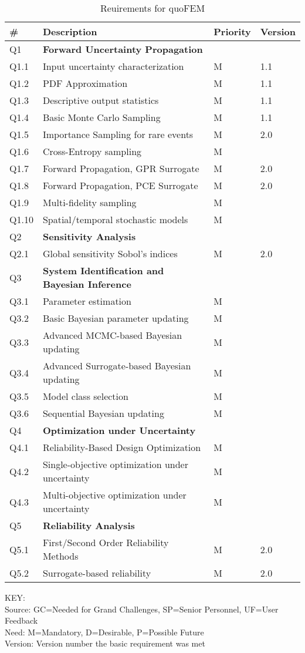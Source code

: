 \begin{longtable}{| p{} | p{} | p{} | p{} |}

\caption{Reuirements for quoFEM}             
  \label{tab:featureQuo_FEM}     
     \\
   \hline
\rowcolor{lightgray}

      \# & Description & Priority & Version \\ \hline
     Q1 & \textbf{Forward Uncertainty Propagation} &  &  \\ 
	Q1.1 & Input uncertainty characterization & M & 1.1 \\ \hline
	Q1.2 & PDF Approximation & M & 1.1 \\ \hline
	Q1.3 &  Descriptive output statistics & M & 1.1 \\ \hline
	Q1.4 &  Basic Monte Carlo Sampling  & M & 1.1 \\ \hline	
	Q1.5 &  Importance Sampling for rare events  & M & 2.0 \\ \hline	
	Q1.6 &  Cross-Entropy sampling  & M &  \\ \hline
	Q1.7 &  Forward Propagation, GPR Surrogate  & M & 2.0 \\ \hline
	Q1.8 &  Forward Propagation, PCE Surrogate  & M & 2.0 \\ \hline
	Q1.9 &  Multi-fidelity sampling  & M &  \\ \hline
	Q1.10 &  Spatial/temporal stochastic models  & M &  \\ \hhline{====}
	Q2 & \textbf{Sensitivity Analysis} &  &  \\ \hline
	Q2.1 & Global sensitivity Sobol's indices & M & 2.0  \\ \hhline{====}
	Q3 & \textbf{System Identification and Bayesian Inference} &  &  \\ \hline
	Q3.1 & Parameter estimation & M &  \\ \hline
	Q3.2 & Basic Bayesian parameter updating & M &  \\ \hline
	Q3.3 & Advanced MCMC-based Bayesian updating & M & \\ \hline
	Q3.4 & Advanced Surrogate-based Bayesian updating & M &  \\ \hline
	Q3.5 & Model class selection & M &  \\ \hline
	Q3.6 & Sequential Bayesian updating & M &  \\ \hhline{====}
	Q4 & \textbf{Optimization under Uncertainty} &  &  \\ \hline
	Q4.1 & Reliability-Based Design Optimization & M &  \\ \hline
	Q4.2 & Single-objective optimization under uncertainty & M &  \\ \hline
	Q4.3 & Multi-objective optimization under uncertainty & M &  \\ \hhline{====}
	Q5 & \textbf{Reliability Analysis} &  &  \\ \hline
	Q5.1 & First/Second Order Reliability Methods & M & 2.0 \\ \hline
	Q5.2 & Surrogate-based reliability & M & 2.0 \\ \hline
	\bottomrule
            
\end{longtable}

\noindent
KEY:\\
Source: GC=Needed for Grand Challenges, SP=Senior Personnel, UF=User Feedback \\
Need: M=Mandatory, D=Desirable, P=Possible Future \\
Version: Version number the basic requirement was met 

